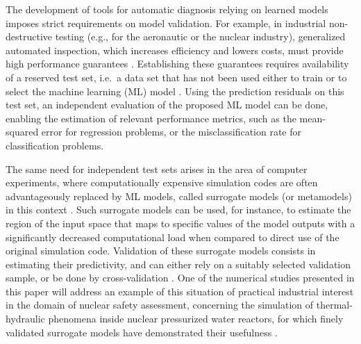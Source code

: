The development of tools for automatic diagnosis relying  on learned models imposes strict requirements on   model validation. 
For example, in industrial non-destructive testing (e.g., for the aeronautic or the nuclear industry), generalized automated inspection, which increases efficiency and lowers costs, must provide high performance guarantees \cite{eni19,hawpat21}. 
Establishing these guarantees requires availability of a reserved test set, i.e.\ a  data set that has not been used either to train or to select the machine learning (ML) model \cite{borjir12,xugoo18,ioo21}. 
Using the prediction residuals on this test set, an independent evaluation of the proposed ML model can be done, enabling the estimation of relevant performance metrics, such as the mean-squared error for regression problems, or the misclassification rate for classification problems.

The same need for independent test sets arises in the area of computer experiments, where computationally expensive simulation codes are often advantageously replaced by ML models, called surrogate models (or metamodels) in this context \cite{sanwil03,fanli06}. 
Such surrogate models can be used, for instance, to  estimate the region of the input space that maps to specific values of the model outputs \cite{chebec14} with a significantly decreased computational load when compared to direct use of the original simulation code. 
Validation of these  surrogate models consists in estimating their predictivity, and can either rely on a suitably selected validation sample, or be done by cross-validation \cite{klesar00,ioobou10,demioo21}. 
One of the numerical studies presented in this paper will address an example of this situation of practical industrial interest in the domain of nuclear safety assessment, concerning the simulation of thermal-hydraulic phenomena inside nuclear pressurized water reactors, for which finely validated surrogate models have demonstrated their usefulness  \cite{lorzan11,marioo21}.

